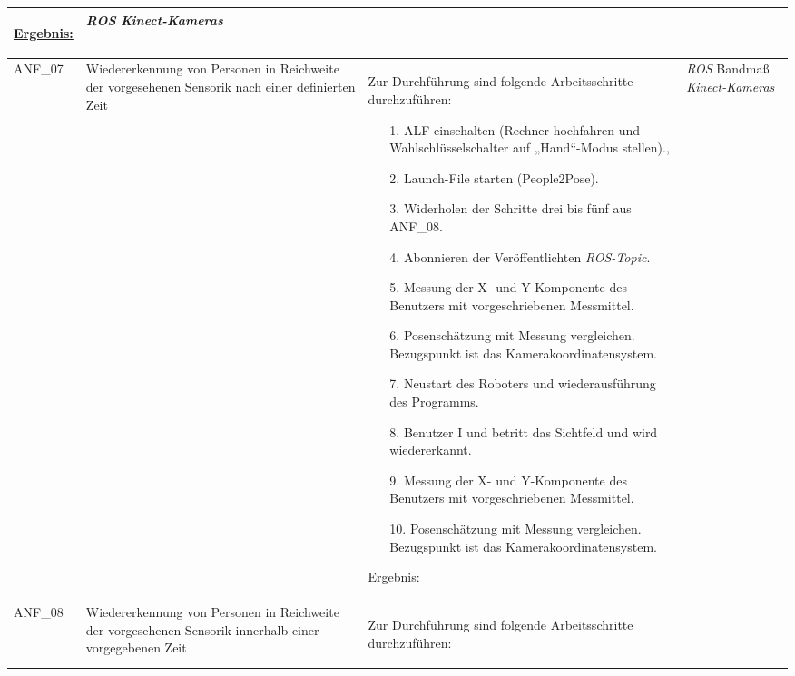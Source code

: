 \documentclass[12pt,a4paper,oneside,numbers=noenddot,captions=tableheading,toc=bibliography,openany,tikz,margin=5mm]{scrbook}
\begin{document}
\begin{longtable}{|p{}|p{}|p{7cm}|p{}|}
\begin{itemize}
\end{itemize}

\underline{Ergebnis:}\newline
\newline

\textbf{}	%
& \textit{ROS}\newline
\textit{Kinect-Kameras}
\\
\hline

ANF\_07 & Wiedererkennung von Personen in Reichweite der vorgesehenen Sensorik nach einer definierten Zeit & Zur Durchführung sind folgende Arbeitsschritte durchzuführen:
\begin{itemize}
	\item[1.]	ALF einschalten (Rechner hochfahren und Wahlschlüsselschalter auf „Hand“-Modus stellen).,
	\item[2.]	Launch-File starten (People2Pose).
	\item[3.]	Widerholen der Schritte drei bis fünf aus ANF\_08.
	\item[4.]	Abonnieren der Veröffentlichten \textit{ROS-Topic}. 
	\item[5.]	Messung der X- und Y-Komponente des Benutzers mit vorgeschriebenen Messmittel.
	\item[6.]	Posenschätzung mit Messung vergleichen. Bezugspunkt ist das Kamerakoordinatensystem.
	\item[7.]	Neustart des Roboters und wiederausführung des Programms.
	\item[8.]	Benutzer I und betritt das Sichtfeld und wird wiedererkannt.
	\item[9.]	Messung der X- und Y-Komponente des Benutzers mit vorgeschriebenen Messmittel.
	\item[10.]	Posenschätzung mit Messung vergleichen. Bezugspunkt ist das Kamerakoordinatensystem.
	
\end{itemize}

\underline{Ergebnis:}\newline
\newline

\textbf{}%
& \textit{ROS}\newline
Bandmaß\newline
\textit{Kinect-Kameras}
\\
	\hline
	ANF\_08 & Wiedererkennung von Personen in Reichweite der vorgesehenen Sensorik innerhalb einer vorgegebenen Zeit & Zur Durchführung sind folgende Arbeitsschritte durchzuführen:
	\begin{itemize}
		

\end{itemize}
\end{longtable}
\end{document}
